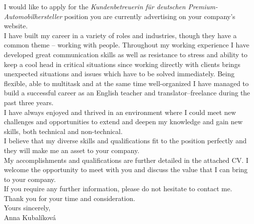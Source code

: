 \documentclass{mycv}
\begin{document}
I would like to apply for the \emph{Kundenbetreuerin für deutschen Premium-Automobilhersteller} position you are currently advertising on your company's website. \\
I have built my career in a variety of roles and industries, though they have a common theme – working with people. Throughout my working experience I have developed great communication skills as well as resistance to stress and ability to keep a cool head in critical situations since working directly with clients brings unexpected situations and issues which have to be solved immediately. Being flexible, able to multitask and at the same time well-organized I have managed to build a successful career as an English teacher and translator–freelance during the past three years. \\
I have always enjoyed and thrived in an environment where I could meet new challenges and opportunities to extend and deepen my knowledge and gain new skills, both technical and non-technical.\\
I believe that my diverse skills and qualifications fit to the position perfectly and they will make me an asset to your company.\\
My accomplishments and qualifications are further detailed in the attached CV. I welcome the opportunity to meet with you and discuss the value that I can bring to your company.\\
If you require any further information, please do not hesitate to contact me.\\

Thank you for your time and consideration.\\

Yours sincerely,\\
Anna Kubalíková
\end{document}
